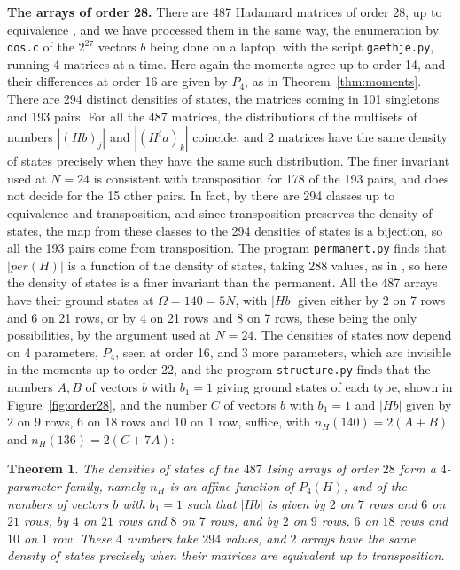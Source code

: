 \documentclass[11pt,a4paper]{article}
\newtheorem{thm}{Theorem}[section]
\theoremstyle{remark}
\begin{document}
\noindent\textbf{The arrays of order 28.} There are 487 Hadamard matrices of order 28, up to equivalence \cite{ki2,spe}, and we have processed them in the same way, the enumeration by \texttt{dos.c} of the $2^{27}$ vectors $b$ being done on a laptop, with the script \texttt{gaethje.py}, running 4 matrices at a time. Here again the moments agree up to order 14, and their differences at order 16 are given by $P_4$, as in Theorem~\ref{thm:moments}. There are 294 distinct densities of states, the matrices coming in 101 singletons and 193 pairs. For all the 487 matrices, the distributions of the multisets of numbers $|(Hb)_j|$ and $|(H^ta)_k|$ coincide, and 2 matrices have the same density of states precisely when they have the same such distribution. The finer invariant used at $N=24$ is consistent with transposition for 178 of the 193 pairs, and does not decide for the 15 other pairs. In fact, by \cite{wls} there are 294 classes up to equivalence and transposition, and since transposition preserves the density of states, the map from these classes to the 294 densities of states is a bijection, so all the 193 pairs come from transposition. The program \texttt{permanent.py} finds that $|per(H)|$ is a function of the density of states, taking 288 values, as in \cite{wls}, so here the density of states is a finer invariant than the permanent. All the 487 arrays have their ground states at $\Omega=140=5N$, with $|Hb|$ given either by $2$ on 7 rows and $6$ on 21 rows, or by $4$ on 21 rows and $8$ on 7 rows, these being the only possibilities, by the argument used at $N=24$. The densities of states now depend on 4 parameters, $P_4$, seen at order 16, and 3 more parameters, which are invisible in the moments up to order 22, and the program \texttt{structure.py} finds that the numbers $A,B$ of vectors $b$ with $b_1=1$ giving ground states of each type, shown in Figure~\ref{fig:order28}, and the number $C$ of vectors $b$ with $b_1=1$ and $|Hb|$ given by $2$ on 9 rows, $6$ on 18 rows and $10$ on 1 row, suffice, with $n_H(140)=2(A+B)$ and $n_H(136)=2(C+7A)$:


\begin{samepage}
\begin{thm}\label{thm:order28}
The densities of states of the $487$ Ising arrays of order $28$ form a $4$-parameter family, namely $n_H$ is an affine function of $P_4(H)$, and of the numbers of vectors $b$ with $b_1=1$ such that $|Hb|$ is given by $2$ on $7$ rows and $6$ on $21$ rows, by $4$ on $21$ rows and $8$ on $7$ rows, and by $2$ on $9$ rows, $6$ on $18$ rows and $10$ on $1$ row. These $4$ numbers take $294$ values, and $2$ arrays have the same density of states precisely when their matrices are equivalent up to transposition.
\end{thm}
\end{samepage}
\end{document}
